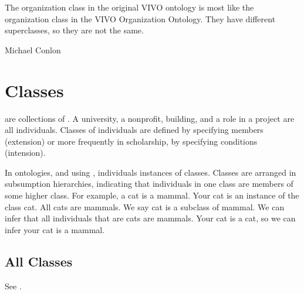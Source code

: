 \documentclass[letterpaper,10pt,english]{sphinxmanual}
\begin{document}
\begin{sphinxShadowBox}

\sphinxAtStartPar
{}
\end{sphinxShadowBox}

\begin{sphinxShadowBox}

\sphinxAtStartPar
The organization class in the original VIVO ontology is most like the organization class in the VIVO Organization Ontology.  They have different superclasses, so they are not the same.
\end{sphinxShadowBox}

\begin{sphinxShadowBox}

\sphinxAtStartPar
Michael Conlon 
\end{sphinxShadowBox}


\chapter{Classes}
\label{\detokenize{classes:classes}}\label{\detokenize{classes::doc}}
\sphinxAtStartPar
{} are collections of .  A university, a nonprofit, building,
and a role in a project are
all individuals.  Classes of individuals are defined by specifying members
(extension) or more frequently
in scholarship, by specifying conditions (intension).

\sphinxAtStartPar
In ontologies, and using {\hyperref[\detokenize{glossary:glossary}]{}}, individuals
instances of classes. Classes are arranged
in subsumption hierarchies, indicating that individuals in one class are members of some
higher class.  For example, a cat is a mammal.  Your cat is an instance of the
class cat.  All cats are mammals.  We say cat is a subclass of mammal.  We can infer
that all individuals that are
cats are mammals.  Your cat is a cat, so we can infer your cat is a mammal.


\section{All Classes}
\label{\detokenize{classes:all-classes}}
\sphinxAtStartPar
See {\hyperref[\detokenize{classes:table-5}]{}}.
\end{document}
